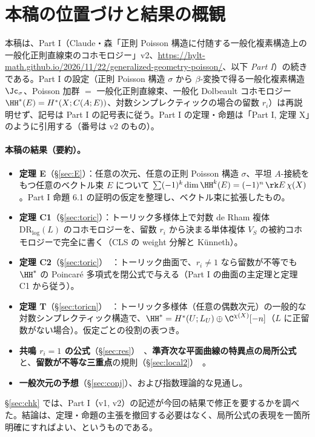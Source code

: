 \section{本稿の位置づけと結果の概観}\label{sec:intro}
本稿は、Part I（Claude・森「正則 Poisson 構造に付随する一般化複素構造上の一般化正則直線束のコホモロジー」v2、\url{https://hylt-math.github.io/2026/11/22/generalized-geometry-poisson/}、以下 \emph{Part I}）の続きである。Part I の設定（正則 Poisson 構造 $\sigma$ から $\beta$-変換で得る一般化複素構造 $\Jc_\sigma$、Poisson 加群 $=$ 一般化正則直線束、一般化 Dolbeault コホモロジー $\HH^*(E)=H^*(X;C(A;E))$、対数シンプレクティックの場合の留数 $r_i$）は再説明せず、記号は Part I の記号表に従う。Part I の定理・命題は「Part I, 定理 X」のように引用する（番号は v2 のもの）。

\paragraph{本稿の結果（要約）。}
\begin{itemize}
\item \textbf{定理 E}（\S\ref{sec:E}）\tP：任意の次元、任意の正則 Poisson 構造 $\sigma$、平坦 $A$-接続をもつ任意のベクトル束 $E$ について $\sum(-1)^k\dim\HH^k(E)=(-1)^n\,\rk E\,\chi(X)$。Part I 命題 6.1 の証明の仮定を整理し、ベクトル束に拡張したもの。
\item \textbf{定理 C1}（\S\ref{sec:toric}）\tP：トーリック多様体上で対数 de Rham 複体 $\mathrm{DR}_{\log}(L)$ のコホモロジーを、留数 $r_i$ から決まる単体複体 $V_S$ の被約コホモロジーで完全に書く（CLS の weight 分解と Künneth）。
\item \textbf{定理 C2}（\S\ref{sec:toric}）\tP\ \tV：トーリック曲面で、$r_i\ne1$ なら留数が不等でも $\HH^*$ の Poincaré 多項式を閉公式で与える（Part I の曲面の主定理と定理 C1 から従う）。
\item \textbf{定理 T}（\S\ref{sec:toricn}）\tP\ \tV：トーリック多様体（任意の偶数次元）の一般的な対数シンプレクティック構造で、$\HH^*=H^*(U;L_U)\oplus\C^{\chi(X)}[-n]$（$L$ に正留数がない場合）。仮定ごとの役割の表つき。
\item \textbf{共鳴 $r_i=1$ の公式}（\S\ref{sec:res}）\tV\ \tK、\textbf{準斉次な平面曲線の特異点の局所公式}と、\textbf{留数が不等な三重点}の規則（\S\ref{sec:local2}）\tV\ \tK。
\item \textbf{一般次元の予想}（\S\ref{sec:conj}）\tK、および指数理論的な見通し。
\end{itemize}
\S\ref{sec:chk} では、Part I（v1, v2）の記述が今回の結果で修正を要するかを調べた。結論は、定理・命題の主張を撤回する必要はなく、局所公式の表現を一箇所明確にすればよい、というものである。

